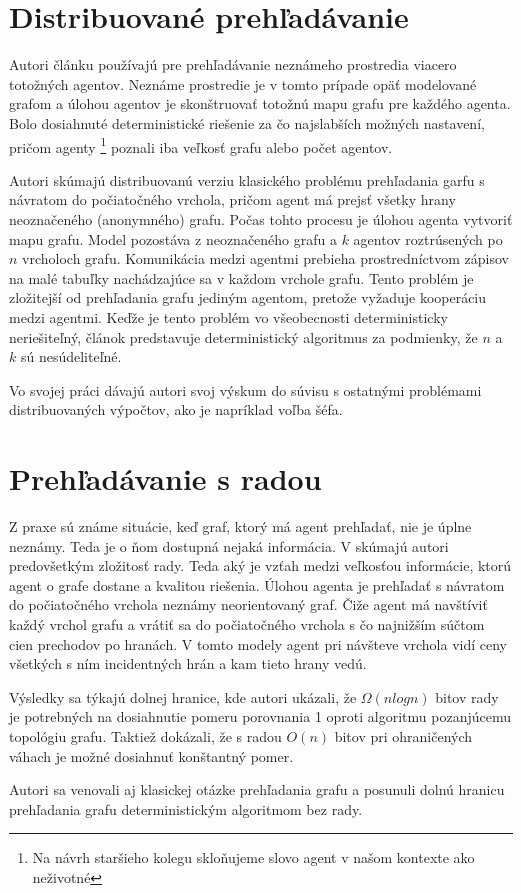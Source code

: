 \section{Distribuované prehľadávanie}
Autori článku \cite{DEA} používajú pre prehľadávanie neznámeho prostredia
viacero totožných agentov. Neznáme prostredie je v tomto prípade opäť
modelované grafom a úlohou agentov je skonštruovať totožnú mapu grafu pre
každého agenta. Bolo dosiahnuté deterministické riešenie za čo najslabších možných
nastavení, pričom agenty \footnote{Na návrh staršieho kolegu skloňujeme
slovo agent v našom kontexte ako neživotné} poznali iba veľkosť grafu alebo
počet agentov.

Autori skúmajú distribuovanú verziu
klasického problému prehľadania garfu s návratom do počiatočného vrchola,
pričom agent má prejsť všetky hrany neoznačeného (anonymného) grafu. Počas
tohto procesu je úlohou agenta vytvoriť mapu grafu. Model pozostáva z
neoznačeného grafu a $k$ agentov roztrúsených po $n$ vrcholoch grafu.
Komunikácia medzi agentmi prebieha prostredníctvom zápisov na malé tabuľky
nachádzajúce sa v každom vrchole grafu. Tento problém je zložitejší od
prehľadania grafu jediným agentom, pretože vyžaduje kooperáciu medzi
agentmi. Keďže je tento problém vo všeobecnosti deterministicky
neriešiteľný, článok predstavuje deterministický algoritmus za podmienky, že
$n$ a $k$ sú nesúdeliteľné.

Vo svojej práci dávajú autori
svoj výskum do súvisu s ostatnými problémami distribuovaných výpočtov, ako
je napríklad voľba šéfa.

\section{Prehľadávanie s radou}
Z praxe sú známe situácie, keď graf, ktorý má agent prehľadať, nie je úplne
neznámy. Teda je o ňom dostupná nejaká informácia. V \cite{Kral} skúmajú
autori predovšetkým zložitosť rady. Teda aký je vzťah medzi veľkosťou
informácie, ktorú agent o grafe dostane a kvalitou riešenia. Úlohou agenta
je prehľadať s návratom do počiatočného vrchola neznámy neorientovaný graf.
Čiže agent má navštíviť každý vrchol grafu a vrátiť sa do počiatočného
vrchola s čo najnižším súčtom cien prechodov po hranách. V tomto modely
agent pri návšteve vrchola vidí ceny všetkých s ním incidentných hrán a kam
tieto hrany vedú.

Výsledky sa týkajú dolnej hranice, kde autori ukázali, že $\Omega (n log n)$
bitov rady je potrebných na dosiahnutie pomeru porovnania 1 oproti algoritmu
pozanjúcemu topológiu grafu. Taktiež dokázali, že s radou $O(n)$ bitov pri
ohraničených váhach je možné dosiahnuť konštantný pomer.

Autori sa venovali aj klasickej otázke prehľadania grafu a posunuli dolnú
hranicu prehľadania grafu deterministickým algoritmom bez rady.
